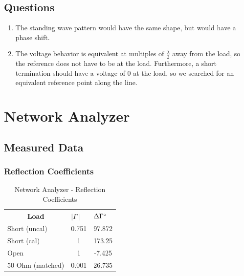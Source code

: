 \documentclass{article}
\begin{document}
\subsection{Questions}
\begin{enumerate}
	\item The standing wave pattern would have the same shape, but would have a phase shift.
	\item The voltage behavior is equivalent at multiples of $\frac{\lambda}{2}$ away from the load, so the reference does not have to be at the load. Furthermore, a short termination should have a voltage of 0 at the load, so we searched for an equivalent reference point along the line.
\end{enumerate}

\section{Network Analyzer}
\subsection{Measured Data}
\subsubsection{Reflection Coefficients}
\begin{table}[H]
\centering
	\begin{tabular}{|l|c|c|}
	\hline
	\multicolumn{1}{|c|}{\textbf{Load}} & \multicolumn{1}{l|}{\textbf{$\mid\Gamma\mid$}} & \multicolumn{1}{l|}{\textbf{$\Delta\Gamma\degree$}} \\ \hline
	Short (uncal)                       & 0.751                               & 97.872                              	\\ \hline
	Short (cal)                         & 1                                   & 173.25                              	\\ \hline
	Open                                & 1                                   & -7.425                              	\\ \hline
	50 Ohm (matched)                    & 0.001                               & 26.735                              	\\ \hline
	\end{tabular}
	\caption{Network Analyzer - Reflection Coefficients}
	\label{}
\end{table}
\end{document}
